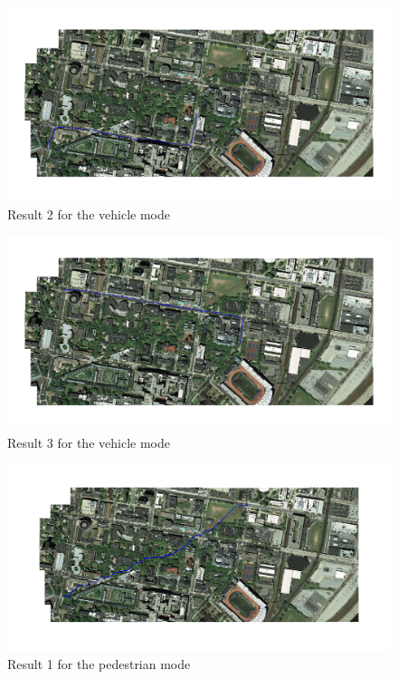\documentclass[english]{article}
\begin{document}
\begin{figure}[thpb]
\centering
\includegraphics[width=\textwidth]{veh_2}
\caption{Result 2 for the vehicle mode}
\end{figure}

\begin{figure}[thpb]
\centering
\includegraphics[width=\textwidth]{veh_5}
\caption{Result 3 for the vehicle mode}
\end{figure}

\begin{figure}[thpb]
\centering
\includegraphics[width=\textwidth]{ped_1}
\caption{Result 1 for the pedestrian mode}
\end{figure}
\end{document}
